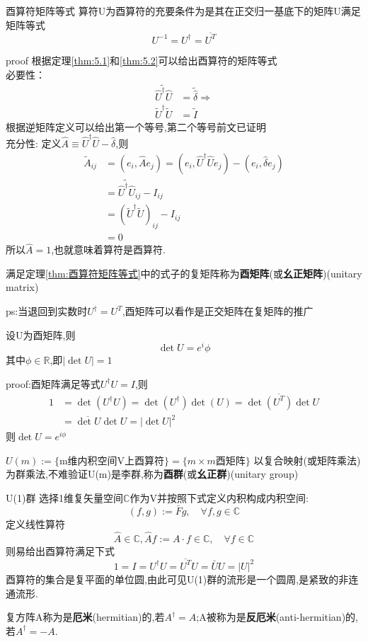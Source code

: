 \documentclass[../main.tex]{subfiles}
\begin{document}
 \begin{theorem}{}{酉算符矩阵等式}
 算符U为酉算符的充要条件为是其在正交归一基底下的矩阵U满足矩阵等式
 $$U^{-1} = U^\dagger = \overline{U^T}$$
 \end{theorem}
 proof 根据定理\ref{thm:5.1}和\ref{thm:5.2}可以给出酉算符的矩阵等式\\
 必要性：
 \begin{align*}
     \widetilde{\hat{U}^\dagger \hat{U}} &= \tilde{\hat{\delta}} \Rightarrow \\
     \tilde{U}^\dagger \tilde{U} &= \tilde{I}
 \end{align*}
 根据逆矩阵定义可以给出第一个等号,第二个等号前文已证明\\
 充分性: 定义$\hat{A}\equiv \hat{U}^\dagger\hat{U} - \hat{\delta}$,则
 \begin{align*}
 \tilde{A}_{ij}&= (e_i,\hat{A}e_j) = (e_i, \hat{U}^\dagger\hat{U}e_j) - (e_i,\hat{\delta}e_j)\\
 &=\widetilde{\hat{U}^\dagger\hat{U}}_{ij} - I_{ij}\\
 &=(\tilde{U}^\dagger\tilde{U})_{ij}- I_{ij}\\
 &= 0
 \end{align*}
 所以$\hat{A} = 1$,也就意味着算符是酉算符.
 \begin{definition}
   满足定理\ref{thm:酉算符矩阵等式}中的式子的复矩阵称为\textbf{酉矩阵}(或\textbf{幺正矩阵})(unitary matrix)  
 \end{definition}
 ps:当退回到实数时$U^\dagger = U^T$,酉矩阵可以看作是正交矩阵在复矩阵的推广

 \begin{theorem}
     设U为酉矩阵,则
     $$\det U = e^i\phi $$
     其中$\phi \in \mathbb{R}$,即$|\det U| = 1$
 \end{theorem}
 proof:酉矩阵满足等式$U^\dagger U = I$,则
 \begin{align*}
     1 &= \det(U^\dagger U) = \det(U^\dagger)\det(U) = \det\overline{(U^T)} \det U\\
         &=\overline{\det U}\det U = |\det U|^2
 \end{align*}
 则$\det U = e^{i\phi}$

 \begin{definition}
     $U(m) := \{\text{m维内积空间V上酉算符}\} = \{m\times m \text{酉矩阵}\}$
     以复合映射(或矩阵乘法)为群乘法,不难验证U(m)是李群,称为\textbf{酉群}(或\textbf{幺正群})(unitary group)
 \end{definition}
 \begin{example}{U(1)群}
 \label{U(1)群}
 选择1维复矢量空间$\mathbb{C}$作为V并按照下式定义内积构成内积空间:
 $$(f,g):=\bar{F}g,\quad \forall f,g \in \mathbb{C}$$
 定义线性算符
 $$ \hat{A} \in \mathbb{C}, \hat{A}f:= A\cdot f \in \mathbb{C},\quad \forall f \in \mathbb{C}$$
 则易给出酉算符满足下式
 $$1 = I = U^\dagger U = \overline{U^T}U = \bar{U}{U} = |U|^2$$
 酉算符的集合是复平面的单位圆,由此可见U(1)群的流形是一个圆周,是紧致的非连通流形.
 \end{example}
 \begin{definition}
     复方阵A称为是\textbf{厄米}(hermitian)的,若$A^\dagger = A$;A被称为是\textbf{反厄米}(anti-hermitian)的,若$A^\dagger = -A$.
 \end{definition}
\end{document}
